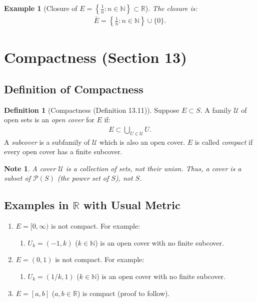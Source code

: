 \documentclass[9pt]{article}
\theoremstyle{definition}
\newtheorem{definition}{Definition}
\theoremstyle{plain}
\newtheorem{example}{Example}
\newtheorem{note}{Note}
\begin{document}
\begin{example}[Closure of $ E = \left\{\frac{1}{n} : n \in \mathbb{N}\right\} \subset \mathbb{R} $]
The closure is:
\begin{align}
\overline{E} = \left\{\frac{1}{n} : n \in \mathbb{N}\right\} \cup \{0\}.
\end{align}
\end{example}
\section*{Compactness (Section 13)}

\subsection*{Definition of Compactness}
\begin{definition}[Compactness (Definition 13.11)]
Suppose $ E \subset S $. A family $ \mathcal{U} $ of open sets is an \textit{open cover} for $ E $ if:
\begin{align}
E \subset \bigcup_{U \in \mathcal{U}} U.
\end{align}
A \textit{subcover} is a subfamily of $ \mathcal{U} $ which is also an open cover. $ E $ is called \textit{compact} if every open cover has a finite subcover.
\end{definition}

\begin{note}
A cover $ \mathcal{U} $ is a collection of sets, not their union. Thus, a cover is a subset of $ \mathcal{P}(S) $ (the power set of $ S $), not $ S $.
\end{note}

\subsection*{Examples in $ \mathbb{R} $ with Usual Metric}
\begin{enumerate}
    \item $ E = [0, \infty) $ is not compact. For example:
    \begin{enumerate}
        \item $ U_k = (-1, k) $ ($ k \in \mathbb{N} $) is an open cover with no finite subcover.
    \end{enumerate}
    \item $ E = (0, 1) $ is not compact. For example:
    \begin{enumerate}
        \item $ U_k = (1/k, 1) $ ($ k \in \mathbb{N} $) is an open cover with no finite subcover.
    \end{enumerate}
    \item $ E = [a, b] $ ($ a, b \in \mathbb{R} $) is compact (proof to follow).
\end{enumerate}
\end{document}
